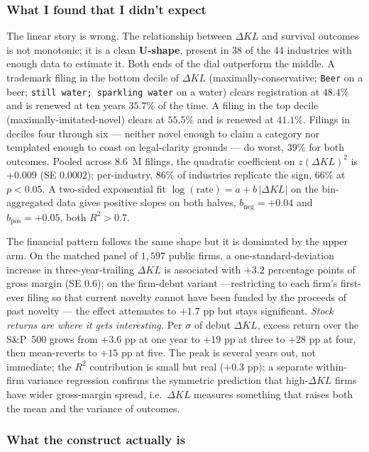 \documentclass[11pt]{article}
\begin{document}
\subsubsection*{What I found that I didn't expect}

The linear story is wrong. The relationship between $\Delta KL$
and survival outcomes is not monotonic; it is a clean
\textbf{U-shape}, present in 38 of the 44 industries with enough
data to estimate it. Both ends of the dial outperform the middle.
A trademark filing in the bottom decile of $\Delta KL$
(maximally-conservative; \texttt{Beer} on a beer; \texttt{still
water; sparkling water} on a water) clears registration at
$48.4\%$ and is renewed at ten years $35.7\%$ of the time. A
filing in the top decile (maximally-imitated-novel) clears at
$55.5\%$ and is renewed at $41.1\%$. Filings in deciles four
through six --- neither novel enough to claim a category nor
templated enough to coast on legal-clarity grounds --- do worst,
$39\%$ for both outcomes. Pooled across 8.6~M filings, the
quadratic coefficient on $z(\Delta KL)^2$ is $+0.009$ (SE
$0.0002$); per-industry, $86\%$ of industries replicate the sign,
$66\%$ at $p<0.05$. A two-sided exponential fit
$\log(\text{rate}) = a + b\,|\Delta KL|$ on the bin-aggregated data
gives positive slopes on both halves, $b_{\text{neg}}=+0.04$ and
$b_{\text{pos}}=+0.05$, both $R^2>0.7$.

The financial pattern follows the same shape but it is dominated
by the upper arm. On the matched panel of $1{,}597$ public firms,
a one-standard-deviation increase in three-year-trailing $\Delta
KL$ is associated with $+3.2$ percentage points of gross margin
(SE $0.6$); on the firm-debut variant ---restricting to each
firm's first-ever filing so that current novelty cannot have been
funded by the proceeds of past novelty --- the effect attenuates
to $+1.7$ pp but stays significant. \emph{Stock returns are where
it gets interesting.} Per $\sigma$ of debut $\Delta KL$, excess
return over the S\&P~500 grows from $+3.6$ pp at one year to
$+19$ pp at three to $+28$ pp at four, then mean-reverts to
$+15$ pp at five. The peak is several years out, not immediate;
the $R^2$ contribution is small but real ($+0.3$ pp); a separate
within-firm variance regression confirms the symmetric prediction
that high-$\Delta KL$ firms have wider gross-margin spread, i.e.\
$\Delta KL$ measures something that raises both the mean and the
variance of outcomes.

\subsubsection*{What the construct actually is}
\end{document}
